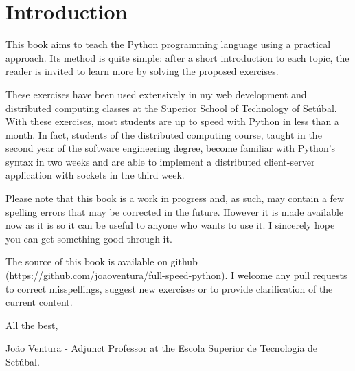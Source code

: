 \chapter{Introduction}\label{introduction}

This book aims to teach the Python programming language using a practical approach. Its method is quite simple: after a short introduction to each topic, the reader is invited to learn more by solving the proposed exercises.

These exercises have been used extensively in my web development and distributed computing classes at the Superior School of Technology of Setúbal. With these exercises, most students are up to speed with Python in less than a month. In fact, students of the distributed computing course, taught in the second year of the software engineering degree, become familiar with Python's syntax in two weeks and are able to implement a distributed client-server application with sockets in the third week.

Please note that this book is a work in progress and, as such, may contain a few spelling errors that may be corrected in the future. However it is made available now as it is so it can be useful to anyone who wants to use it. I sincerely hope you can get something good through it.

The source of this book is available on github (\url{https://github.com/joaoventura/full-speed-python}). I welcome any pull requests to correct misspellings, suggest new exercises or to provide clarification of the current content.

All the best,

João Ventura - Adjunct Professor at the Escola Superior de Tecnologia de Setúbal.
